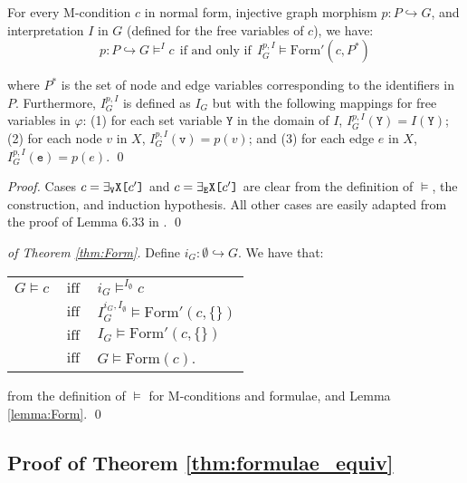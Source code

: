 \documentclass{llncs}
\newcommand{\mt}[1]{\text{\tt{#1}}}
\begin{document}
	\begin{lemma}\label{lemma:Form}\rm
		For every M-condition $c$ in normal form, injective graph morphism $p\!:P\hookrightarrow G$, and interpretation $I$ in $G$ (defined for the free variables of $c$), we have:
		\[ p\!:P\hookrightarrow G \models^I c\ \ \text{if and only if}\ \ I_G^{p,I} \models \text{Form}'(c,P^*) \]
		
		\noindent where $P^*$ is the set of node and edge variables corresponding to the identifiers in $P$. Furthermore, $I_G^{p,I}$ is defined as $I_G$ but with the following mappings for free variables in $\varphi$: (1) for each set variable $\mathtt{Y}$ in the domain of $I$, $I_G^{p,I} (\mathtt{Y}) = I(\mathtt{Y})$; (2) for each node $v$ in $X$, $I_G^{p,I} (\mathtt{v}) = p(v)$; and (3) for each edge $e$ in $X$, $I_G^{p,I} (\mathtt{e}) = p(e)$.
		\qed
	\end{lemma}
	
	\begin{proof}
		Cases $c = \exists_\mathtt{V}\mathtt{X}\mt{[}c'\mt{]}$ and $c = \exists_\mathtt{E}\mathtt{X}\mt{[}c'\mt{]}$ are clear from the definition of $\models$, the construction, and induction hypothesis. All other cases are easily adapted from the proof of Lemma 6.33 in \cite{Poskitt13a}.
		\qed
	\end{proof}
	
	
	\begin{proof}[of Theorem \ref{thm:Form}]
		Define $i_G\!:\emptyset \hookrightarrow G$. We have that:
		
		\begin{center}\begin{tabular}{r c l}
			$G \models c$ &$\ \text{iff}\ $& $i_G \models^{I_\emptyset} c$ \\
			&$\ \text{iff}\ $& $I_G^{i_G,I_\emptyset}\models \text{Form}'(c,\{\})$ \\
			&$\ \text{iff}\ $& $I_G\models \text{Form}'(c,\{\})$ \\
			&$\ \text{iff}\ $& $G\models \text{Form}(c)$.
		\end{tabular}\end{center}
		
		\noindent from the definition of $\models$ for M-conditions and formulae, and Lemma \ref{lemma:Form}.
		\qed
	\end{proof}
	
	\subsection{Proof of Theorem \ref{thm:formulae_equiv}}\label{thm:formulae_equiv:PROOF}
	
\end{document}
